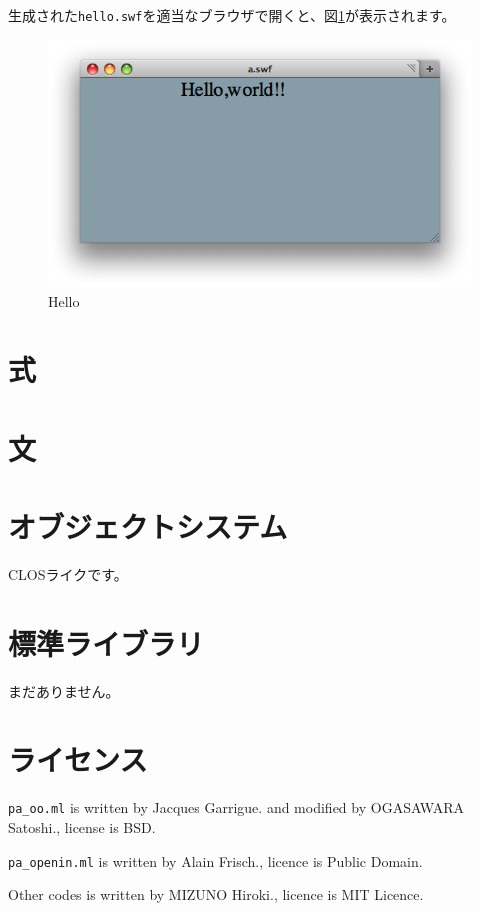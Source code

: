 \documentclass{article}
\begin{document}
生成された\verb!hello.swf!を適当なブラウザで開くと、図\ref{hello}が表示されます。

\begin{figure}
\centering
\includegraphics{hello.png}
\caption{Hello}\label{hello}
\end{figure}


\section{式}
\section{文}

\section{オブジェクトシステム}
CLOSライクです。

\section{標準ライブラリ}
まだありません。

\section{ライセンス}
\verb!pa_oo.ml! is written by Jacques Garrigue. and modified by OGASAWARA Satoshi., license is BSD.

\verb!pa_openin.ml! is written by Alain Frisch., licence is Public Domain.

Other codes is written by MIZUNO Hiroki., licence is MIT Licence.
\end{document}

